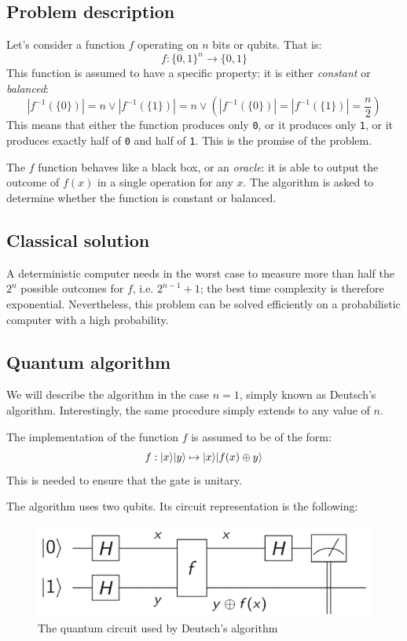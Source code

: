 \documentclass[12pt,a4paper]{article}
\theoremstyle{plain}
\theoremstyle{definition}
\DeclarePairedDelimiter\ket{\lvert}{\rangle}
\begin{document}
\subsection{Problem description}
Let's consider a function $f$ operating on $n$ bits or qubits. That is:
\begin{equation*}
    f : \{ 0, 1 \}^n \to \{ 0, 1 \}
\end{equation*}
This function is assumed to have a specific property: it is either \emph{constant} or \emph{balanced}:
\begin{equation*}
    |f^{-1}(\{0\})| = n \lor |f^{-1}(\{1\})| = n \lor \left(|f^{-1}(\{0\})| = |f^{-1}(\{1\})| = \frac{n}{2}\right)
\end{equation*}
This means that either the function produces only \texttt{0}, or it produces only \texttt{1}, or it produces exactly half of \texttt{0} and half of \texttt{1}. This is the promise of the problem.

The $f$ function behaves like a black box, or an \emph{oracle}: it is able to output the outcome of $f(x)$ in a single operation for any $x$. The algorithm is asked to determine whether the function is constant or balanced.

\subsection{Classical solution}
A deterministic computer needs in the worst case to measure more than half the $2^n$ possible outcomes for $f$, i.e. $2^{n-1}+1$; the best time complexity is therefore exponential. Nevertheless, this problem can be solved efficiently on a probabilistic computer with a high probability.

\subsection{Quantum algorithm}
We will describe the algorithm in the case $n=1$, simply known as Deutsch's algorithm. Interestingly, the same procedure simply extends to any value of $n$. 

The implementation of the function $f$ is assumed to be of the form:
\begin{equation*}
    f : \ket{x}\ket{y} \mapsto \ket{x}\ket{f(x)\oplus y}
\end{equation*}
This is needed to ensure that the gate is unitary.

The algorithm uses two qubits. Its circuit representation is the following:
\begin{figure}[!ht]
    \centering
    \includegraphics*[scale=0.4]{deutsch-circuit.png}
    \caption{The quantum circuit used by Deutsch's algorithm}
\end{figure}
\end{document}
